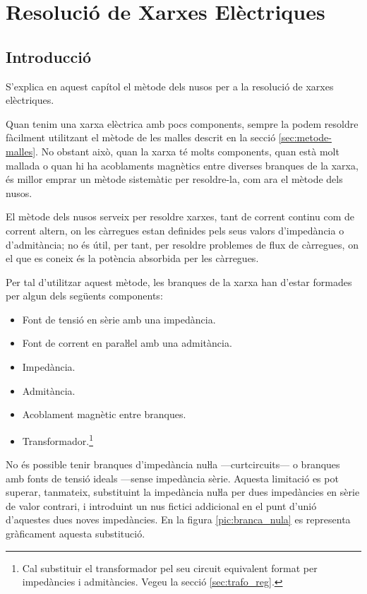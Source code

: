 \chapter{Resolució de Xarxes Elèctriques} \label{sec:ch-xarxes-elec}
\section{Introducció}\label{sec:ch-xarxes-elec-intro}
S'explica en aquest capítol el
mètode dels nusos per a la resolució de xarxes elèctriques.

Quan tenim una xarxa elèctrica amb pocs components, sempre la podem resoldre fàcilment
utilitzant el mètode de les malles descrit en la secció \vref{sec:metode-malles}. No obstant això, quan la xarxa té molts components, quan està
 molt mallada o quan hi ha acoblaments magnètics entre diverses branques de la xarxa, és millor
 emprar un mètode sistemàtic per  resoldre-la, com ara el mètode dels nusos.

El mètode dels nusos serveix per resoldre xarxes, tant de corrent
continu com de corrent altern, on les càrregues estan definides pels
seus valors d'impedància o d'admitància; no és útil, per tant, per
resoldre problemes de flux de càrregues, on el que es coneix és la
potència absorbida per les càrregues.

Per tal d'utilitzar aquest mètode, les branques de la xarxa han d'estar
formades per algun dels següents components: \vspace{-1.5mm}
\begin{itemize}
   \item Font de tensió en sèrie amb una impedància.
   \item Font de corrent en paraŀlel amb una admitància.
   \item Impedància.
   \item Admitància.
   \item Acoblament magnètic entre branques.
   \item Transformador.\footnote{Cal substituir el transformador pel seu circuit equivalent format per impedàncies i    admitàncies. Vegeu la secció \ref{sec:trafo_reg}.}
\end{itemize}
\vspace{-1.5mm}

No és possible tenir branques d'impedància nuŀla ---curtcircuits--- o
branques amb fonts de tensió ideals  ---sense impedància sèrie.
Aquesta limitació es pot superar, tanmateix, substituint la
impedància nuŀla per dues impedàncies en sèrie  de valor
contrari, i introduint un nus fictici addicional en el punt d'unió
d'aquestes dues noves impedàncies. En la figura
\vref{pic:branca_nula}
 es representa gràficament aquesta substitució. 
\begin{center}
   
    \label{pic:branca_nula}
\end{center}


